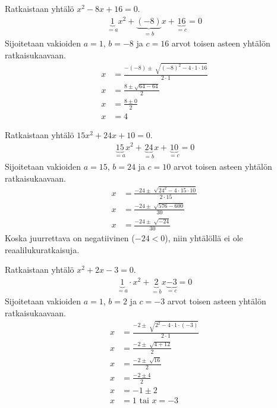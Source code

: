 \begin{esimerkki}
Ratkaistaan yhtälö $x^2-8x+16=0$.
\begin{align*}
\underbrace{1}_{=a}x^2 +\underbrace{(-8)}_{=b}x+\underbrace{16}_{=c}=0
\end{align*}
Sijoitetaan vakioiden $a=1$, $b=-8$ ja $c=16$ arvot toisen asteen yhtälön
ratkaisukaavaan.
\begin{align*}
x&=\frac{-(-8)\pm \sqrt[]{(-8)^2-4\cdot 1 \cdot 16}}{2 \cdot 1} \\
x&=\frac{8 \pm \sqrt{64- 64}}{2} \\
x&=\frac{8 \pm 0}{2} \\
x&=4
\end{align*}
\end{esimerkki}

\begin{esimerkki}
Ratkaistaan yhtälö $15x^2+24x+10=0$.
\begin{align*}
\underbrace{15}_{=a}x^2+\underbrace{24}_{=b}x+\underbrace{10}_{=c}=0
\end{align*}
Sijoitetaan vakioiden $a=15$, $b=24$ ja $c=10$ arvot toisen asteen yhtälön ratkaisukaavaan.
\begin{align*}
x&=\frac{-24 \pm \sqrt[]{24^2-4 \cdot 15 \cdot 10}}{2 \cdot 15} \\
x&=\frac{-24 \pm \sqrt[]{576-600}}{30} \\
x&=\frac{-24 \pm \sqrt[]{-24}}{30}
\end{align*}
Koska juurrettava on negatiivinen ($-24<0$), niin yhtälöllä ei ole reaalilukuratkaisuja. \\
\end{esimerkki}

\begin{esimerkki}
Ratkaistaan yhtälö $x^2+2x-3=0$.
\begin{align*}
\underbrace{1}_{=a} \cdot x^2+\underbrace{2}_{=b}x\underbrace{-3}_{=c}=0
\end{align*}
Sijoitetaan vakioiden $a=1$, $b=2$ ja $c=-3$ arvot toisen asteen yhtälön ratkaisukaavaan.
\begin{align*}
x&=\frac{-2 \pm \sqrt[]{2^2-4 \cdot 1 \cdot (-3)}}{2 \cdot 1} \\
x&=\frac{-2 \pm \sqrt[]{4+12}}{2} \\
x&=\frac{-2 \pm \sqrt[]{16}}{2} \\
x&=\frac{-2 \pm 4}{2} \\
x&=-1 \pm 2 \\
x&=1 \text{ tai } x=-3 \\
\end{align*}
\end{esimerkki}

